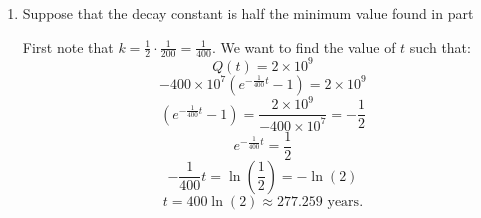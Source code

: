\documentclass[nooutcomes, handout]{ximera}
\begin{document}
\begin{problem}
\begin{enumerate}
		
		
	\item  Suppose that the decay constant is half the minimum value found in part %
		\begin{freeResponse}
		First note that $k = \frac{1}{2} \cdot \frac{1}{200} = \frac{1}{400}$.  
		We want to find the value of $t$ such that:
			\begin{equation*}
			Q(t) = 2 \times 10^9
			\end{equation*}
			\begin{equation*}
			- 400 \times 10^7 \left(e^{-\frac{1}{400}t}-1 \right) = 2 \times 10^9
			\end{equation*}
			\begin{equation*}
			\left(e^{-\frac{1}{400}t}-1 \right) = \frac{2 \times 10^9}{-400 \times 10^7} = - \frac{1}{2}
			\end{equation*}
			\begin{equation*}
			e^{-\frac{1}{400}t} = \frac{1}{2}
			\end{equation*}
			\begin{equation*}
			-\frac{1}{400}t=\ln \left(\frac{1}{2} \right) = -\ln(2)
			\end{equation*}
			\begin{equation*}
			t = 400 \ln(2) \approx 277.259 \text{ years}.
			\end{equation*}
		\end{freeResponse}
		
		
		
	\end{enumerate}
		
		
		

\end{problem}



								
				
				
	
\end{document}
